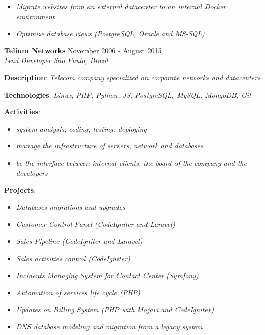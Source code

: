 \documentclass[margin]{res}
\begin{document}
\begin{resume}
\begin{description}
{\begin{itemize}
              \item{\textit{Migrate websites from an external datacenter to an internal Docker environment}}
              \item{\textit{Optimize database views (PostgreSQL, Oracle and MS-SQL)}}
            \end{itemize}
    }
      \end{description}
    \pagebreak
    \textbf{Telium Networks} \hfill {November 2006 - August 2015}\\
  \textit{Lead Developer} \hfill \textit{Sao Paulo, Brazil}\\
  \begin{description}
    \item{\textbf{Description}: \textit{Telecom company specialized on corporate networks and datacenters}}
    \item{\textbf{Technologies}: \textit{Linux, PHP, Python, JS, PostgreSQL, MySQL, MongoDB, Git}}
    \item{
      \textbf{Activities}:
      \begin{itemize}
              \item{\textit{system analysis, coding, testing, deploying}}
              \item{\textit{manage the infrastructure of servers, network and databases}}
              \item{\textit{be the interface between internal clients, the board of the company and the developers}}
            \end{itemize}
    }
        \item{
      \textbf{Projects}:
      \begin{itemize}
              \item{\textit{Databases migrations and upgrades}}
              \item{\textit{Customer Control Panel (CodeIgniter and Laravel)}}
              \item{\textit{Sales Pipeline (CodeIgniter and Laravel)}}
              \item{\textit{Sales activities control (CodeIgniter)}}
              \item{\textit{Incidents Managing System for Contact Center (Symfony)}}
              \item{\textit{Automation of services life cycle (PHP)}}
              \item{\textit{Updates on Billing System (PHP with Mojavi and CodeIgniter)}}
              \item{\textit{DNS database modeling and migration from a legacy system}}

\end{itemize}}
\end{description}
\end{resume}
\end{document}
